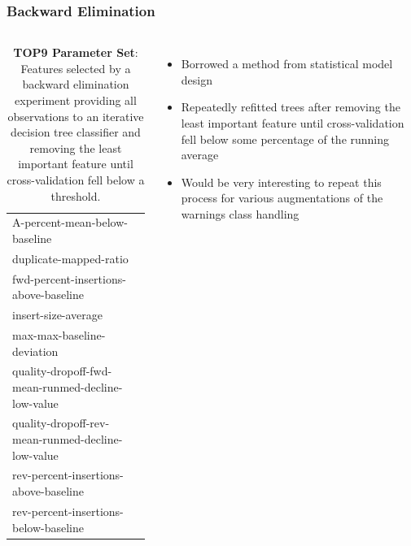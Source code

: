 \documentclass{beamer}
\begin{document}
\begin{frame}[t]
\frametitle{Backward Elimination}
    \begin{columns}[c]
        \column{5cm}
            \begin{table}[H]
                \centering
                \tiny
                \begin{tabular}{l}
                    A-percent-mean-below-baseline                     \\
                    duplicate-mapped-ratio                            \\
                    fwd-percent-insertions-above-baseline             \\
                    insert-size-average                               \\
                    max-max-baseline-deviation                        \\
                    quality-dropoff-fwd-mean-runmed-decline-low-value \\
                    quality-dropoff-rev-mean-runmed-decline-low-value \\
                    rev-percent-insertions-above-baseline             \\
                    rev-percent-insertions-below-baseline             \\
                \end{tabular}

                \tiny{\caption[top9-params]{\tiny{\textbf{TOP9 Parameter Set}: Features selected by a
                    backward elimination experiment providing all observations to an
                    iterative decision tree classifier and removing the least important
                    feature until cross-validation fell below a threshold.
        }}}
            \end{table}
        \column{7cm}
            \begin{itemize}
                \item Borrowed a method from statistical model design
                \item Repeatedly refitted trees after removing the least important feature
                    until cross-validation fell below some percentage of the running average
                \item Would be very interesting to repeat this process for various
                    augmentations of the warnings class handling
            \end{itemize}
    \end{columns}
\end{frame}
\end{document}
